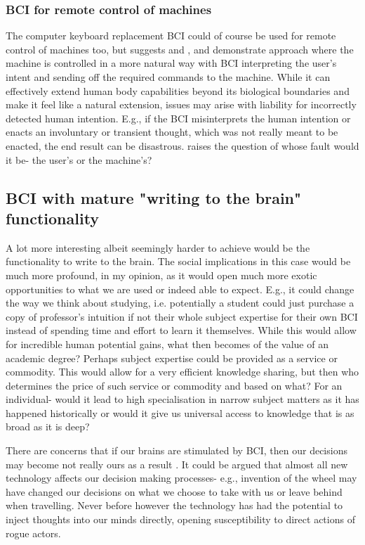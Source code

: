 \documentclass[fleqn,11pt]{olplainarticle}
\begin{document}
\subsubsection{BCI for remote control of machines}
The computer keyboard replacement BCI could of course be used for remote control of machines too, but \cite{schalk2008brain} suggests and \cite{warwick2003cyborg}, \cite{wakefield_2020} and \cite{luz2017enrichment} demonstrate approach where the machine is controlled in a more natural way with BCI interpreting the user's intent and sending off the required commands to the machine. While it can effectively extend human body capabilities beyond its biological boundaries and make it feel like a natural extension, issues may arise with liability for incorrectly detected human intention. E.g., if the BCI misinterprets the human intention or enacts an involuntary or transient thought, which was not really meant to be enacted, the end result can be disastrous. \cite{schalk2008brain} raises the question of whose fault would it be- the user's or the machine's? 

\subsection{BCI with mature "writing to the brain" functionality}
A lot more interesting albeit seemingly harder to achieve would be the functionality to write to the brain. The social implications in this case would be much more profound, in my opinion, as it would open much more exotic opportunities to what we are used or indeed able to expect. E.g., it could change the way we think about studying, i.e. potentially a student could just purchase a copy of professor's intuition if not their whole subject expertise for their own BCI instead of spending time and effort to learn it themselves. While this would allow for incredible human potential gains, what then becomes of the value of an academic degree? Perhaps subject expertise could be provided as a service or commodity. This would allow for a very efficient knowledge sharing, but then who determines the price of such service or commodity and based on what? For an individual- would it lead to high specialisation in narrow subject matters as it has happened historically or would it give us universal access to knowledge that is as broad as it is deep? 

There are concerns that if our brains are stimulated by BCI, then our decisions may become not really ours as a result \cite{kogel2019using}. It could be argued that almost all new technology affects our decision making processes- e.g., invention of the wheel may have changed our decisions on what we choose to take with us or leave behind when travelling. Never before however the technology has had the potential to inject thoughts into our minds directly, opening susceptibility to direct actions of rogue actors.
\end{document}
